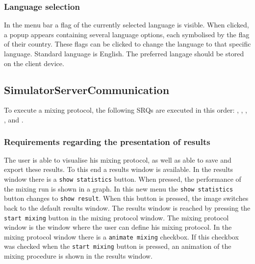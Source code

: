 
\subsubsection{Language selection}
In the menu bar a flag of the currently selected language is visible. When clicked, a popup appears containing several language options, each symbolised by the flag of their country. These flags can be clicked to change the language to that specific language. Standard language is English. The preferred langage should be stored on the client device.


\subsection{SimulatorServerCommunication}
To execute a mixing protocol, the following SRQs are executed in this order: , , , ,  and .




\subsubsection{Requirements regarding the presentation of results}
The user is able to visualise his mixing protocol, as well as able to save and export these results. To this end a results window is available. In the results window there is a \texttt{show statistics} button. When pressed, the performance of the mixing run is shown in a graph. In this new menu the \texttt{show statistics} button changes to \texttt{show result}. When this button is pressed, the image switches back to the default results window. The results window is reached by pressing the \texttt{start mixing} button in the mixing protocol window. The mixing protocol window is the window where the user can define his mixing protocol. In the mixing protocol window there is a \texttt{animate mixing} checkbox. If this checkbox was checked when the \texttt{start mixing} button is pressed, an animation of the mixing procedure is shown in the results window.

